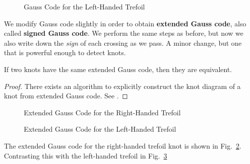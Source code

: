         \begin{figure}
            \centering
            \caption{Gauss Code for the Left-Handed Trefoil}
            \label{fig:left_handed_trefoil_gauss_code}
        \end{figure}
        \par\hfill\par
        We modify Gauss code slightly in order to obtain
        \textbf{extended Gauss code}, also called \textbf{signed Gauss code}.
        We perform the same steps as before, but now we also write down the
        \textit{sign} of each crossing as we pass. A minor change, but one
        that is powerful enough to detect knots.
        \begin{theorem}
            If two knots have the same extended Gauss code, then they are
            equivalent.
        \end{theorem}
        \begin{proof}
            There exists an algorithm to explicitly construct the knot diagram
            of a knot from extended Gauss code. See
            \cite{KauffmanVirtualKnots1999}.
        \end{proof}
        \begin{figure}
            \centering
            \caption{Extended Gauss Code for the Right-Handed Trefoil}
            \label{fig:trefoil_knot_oriented_with_extended_gauss_code}
        \end{figure}
        \begin{figure}
            \centering
            \caption{Extended Gauss Code for the Left-Handed Trefoil}
            \label{fig:trefoil_knot_mirror_oriented_with_extended_gauss_code}
        \end{figure}
        The extended Gauss code for the right-handed trefoil knot is shown in
        Fig.~\ref{fig:trefoil_knot_oriented_with_extended_gauss_code}.
        Contrasting this with the left-handed trefoil in
        Fig.~\ref{fig:trefoil_knot_mirror_oriented_with_extended_gauss_code}
